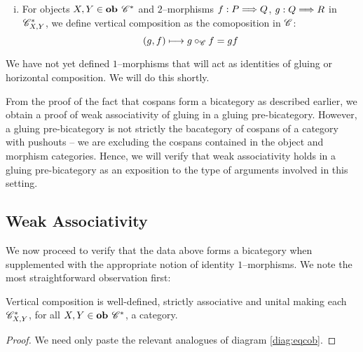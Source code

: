 \documentclass[./Thick_TQFTs_and_Quantum_Information.tex]{subfiles}
\begin{document}
\begin{defn}
\begin{enumerate}[(i)]
\item For objects $X, Y \in \textbf{ob } \mathscr{C}^*$ and $2$--morphisms
$f : P \stackrel{}{\Longrightarrow} Q$, $g : Q \stackrel{}{\Longrightarrow} R$ in $\mathscr{C}^*_{X, Y}$, we define vertical
composition as the comoposition in $\mathscr{C}$:
\[
  (g, f) \longmapsto g \circ_{\mathscr{C}} f = gf
\]

\end{enumerate}
\end{defn}

\begin{rmk}
We have not yet defined $1$--morphisms that will act as identities of gluing or
horizontal composition. We will do this shortly.
\end{rmk}

From the proof of the fact that cospans form a bicategory as described earlier,
we obtain a proof of weak associativity of gluing in a gluing pre-bicategory.
However, a gluing pre-bicategory is not strictly the bacategory of cospans of a
category with pushouts -- we are excluding the cospans contained in the object
and morphism categories. Hence, we will verify that weak associativity holds in
a gluing pre-bicategory as an exposition to the type of arguments involved in
this setting.

\subsection{Weak Associativity}

We now proceed to verify that the data above forms a bicategory when
supplemented with the appropriate notion of identity $1$--morphisms. We note the
most straightforward observation first:
\begin{lem}
Vertical composition is well-defined, strictly associative and unital making
each $\mathscr{C}^*_{X, Y}$, for all $X, Y \in \textbf{ob } \mathscr{C}^*$, a category.
\end{lem}
\begin{proof}
We need only paste the relevant analogues of diagram \eqref{diag:eqcob}.
\end{proof}
\end{document}
